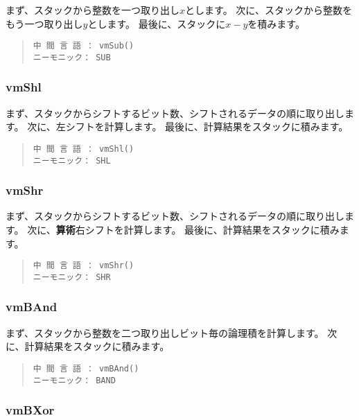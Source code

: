 まず、スタックから整数を一つ取り出し$x$とします。
次に、スタックから整数をもう一つ取り出し$y$とします。
最後に、スタックに$x-y$を積みます。

\begin{quote}
\begin{verbatim}
中 間 言 語 ： vmSub()
ニーモニック： SUB
\end{verbatim}
\end{quote}

\subsubsection{vmShl}

まず、スタックからシフトするビット数、シフトされるデータの順に取り出します。
次に、左シフトを計算します。
最後に、計算結果をスタックに積みます。

\begin{quote}
\begin{verbatim}
中 間 言 語 ： vmShl()
ニーモニック： SHL
\end{verbatim}
\end{quote}

\subsubsection{vmShr}

まず、スタックからシフトするビット数、シフトされるデータの順に取り出します。
次に、{\bf 算術}右シフトを計算します。
最後に、計算結果をスタックに積みます。

\begin{quote}
\begin{verbatim}
中 間 言 語 ： vmShr()
ニーモニック： SHR
\end{verbatim}
\end{quote}

\subsubsection{vmBAnd}

まず、スタックから整数を二つ取り出しビット毎の論理積を計算します。
次に、計算結果をスタックに積みます。

\begin{quote}
\begin{verbatim}
中 間 言 語 ： vmBAnd()
ニーモニック： BAND
\end{verbatim}
\end{quote}

\subsubsection{vmBXor}


